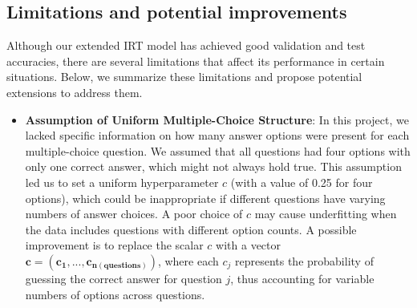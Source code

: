 \documentclass{article}
\begin{document}
\subsection{Limitations and potential improvements}

Although our extended IRT model has achieved good validation and test accuracies, there are several limitations that affect its performance in certain situations. Below, we summarize these limitations and propose potential extensions to address them.

\begin{itemize}
\item \textbf{Assumption of Uniform Multiple-Choice Structure}: In this project, we lacked specific information on how many answer options were present for each multiple-choice question. We assumed that all questions had four options with only one correct answer, which might not always hold true. This assumption led us to set a uniform hyperparameter $c$ (with a value of 0.25 for four options), which could be inappropriate if different questions have varying numbers of answer choices. A poor choice of $c$ may cause underfitting when the data includes questions with different option counts. A possible improvement is to replace the scalar $c$ with a vector $\mathbf{c = (c_1, ..., c_{n(questions)})}$, where each $c_j$ represents the probability of guessing the correct answer for question $j$, thus accounting for variable numbers of options across questions.


\end{itemize}
\end{document}
